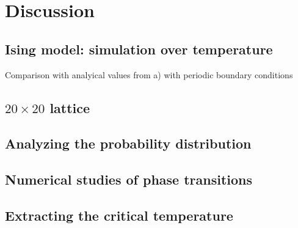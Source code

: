 \documentclass[../main.tex]{subfiles}
\begin{document}
\section{Discussion}

\subsection{Ising model: simulation over temperature}
Comparison with analyical values from a) with periodic boundary conditions




\subsection{$20 \times 20$ lattice}




\subsection{Analyzing the probability distribution}




\subsection{Numerical studies of phase transitions}




\subsection{Extracting the critical temperature}
\end{document}
